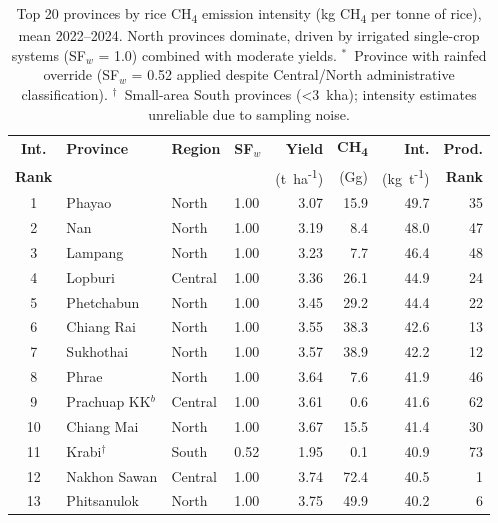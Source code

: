 \documentclass[fleqn,10pt]{olplainarticle}
\begin{document}
\FloatBarrier
\begin{table}[H]
\centering
\small
\caption{Top 20 provinces by rice CH\textsubscript{4} emission intensity
         (kg CH\textsubscript{4} per tonne of rice), mean 2022--2024.
         North provinces dominate, driven by irrigated single-crop systems
         (SF$_w$ = 1.0) combined with moderate yields.
         $^*$~Province with rainfed override (SF$_w$ = 0.52 applied despite
         Central/North administrative classification).
         $^\dagger$~Small-area South provinces (\textless{}3~kha); intensity
         estimates unreliable due to sampling noise.}
\label{tab:top20int}
\begin{tabular}{@{}clllrrrr@{}}
\toprule
\textbf{Int.} & \textbf{Province} & \textbf{Region} & \textbf{SF$_w$} &
  \textbf{Yield} & \textbf{CH\textsubscript{4}} & \textbf{Int.} & \textbf{Prod.} \\
\textbf{Rank} & & & &
  \footnotesize(t~ha\textsuperscript{-1}) & \footnotesize(Gg) &
  \footnotesize(kg~t\textsuperscript{-1}) & \textbf{Rank} \\
\midrule
 1 & Phayao           & North     & 1.00 & 3.07 &  15.9 & 49.7 & 35 \\
 2 & Nan              & North     & 1.00 & 3.19 &   8.4 & 48.0 & 47 \\
 3 & Lampang          & North     & 1.00 & 3.23 &   7.7 & 46.4 & 48 \\
 4 & Lopburi          & Central   & 1.00 & 3.36 &  26.1 & 44.9 & 24 \\
 5 & Phetchabun       & North     & 1.00 & 3.45 &  29.2 & 44.4 & 22 \\
 6 & Chiang Rai       & North     & 1.00 & 3.55 &  38.3 & 42.6 & 13 \\
 7 & Sukhothai        & North     & 1.00 & 3.57 &  38.9 & 42.2 & 12 \\
 8 & Phrae            & North     & 1.00 & 3.64 &   7.6 & 41.9 & 46 \\
 9 & Prachuap KK$^b$  & Central   & 1.00 & 3.61 &   0.6 & 41.6 & 62 \\
10 & Chiang Mai       & North     & 1.00 & 3.67 &  15.5 & 41.4 & 30 \\
11 & Krabi$^\dagger$  & South     & 0.52 & 1.95 &   0.1 & 40.9 & 73 \\
12 & Nakhon Sawan     & Central   & 1.00 & 3.74 &  72.4 & 40.5 &  1 \\
13 & Phitsanulok      & North     & 1.00 & 3.75 &  49.9 & 40.2 &  6 \\

\end{tabular}
\end{table}
\end{document}
